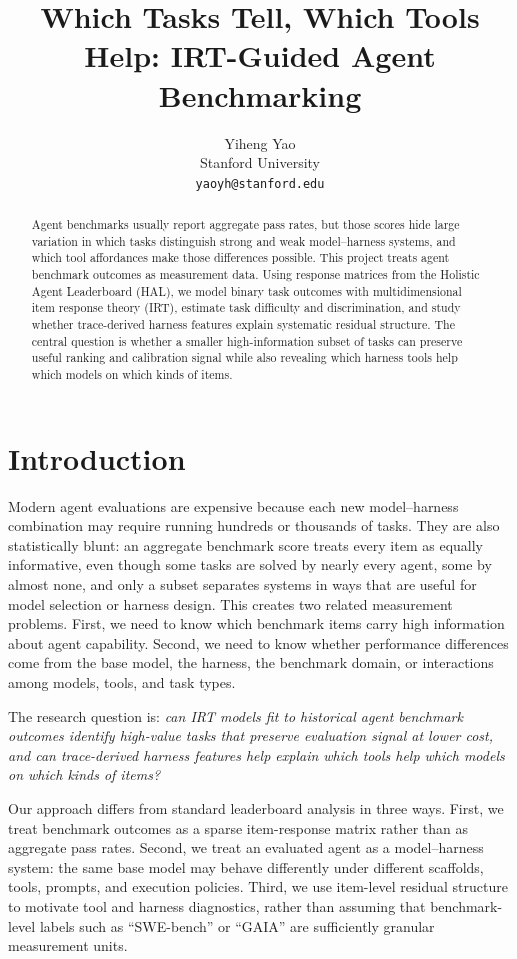 \documentclass{article}
\title{Which Tasks Tell, Which Tools Help: IRT-Guided Agent Benchmarking}
\author{%
  Yiheng Yao\\
  Stanford University\\
  \texttt{yaoyh@stanford.edu}\\
}
\begin{document}
\maketitle

\begin{abstract}
Agent benchmarks usually report aggregate pass rates, but those scores hide large variation in which tasks distinguish strong and weak model--harness systems, and which tool affordances make those differences possible. This project treats agent benchmark outcomes as measurement data. Using response matrices from the Holistic Agent Leaderboard (HAL), we model binary task outcomes with multidimensional item response theory (IRT), estimate task difficulty and discrimination, and study whether trace-derived harness features explain systematic residual structure. The central question is whether a smaller high-information subset of tasks can preserve useful ranking and calibration signal while also revealing which harness tools help which models on which kinds of items.
\end{abstract}

\section{Introduction}

Modern agent evaluations are expensive because each new model--harness combination may require running hundreds or thousands of tasks. They are also statistically blunt: an aggregate benchmark score treats every item as equally informative, even though some tasks are solved by nearly every agent, some by almost none, and only a subset separates systems in ways that are useful for model selection or harness design. This creates two related measurement problems. First, we need to know which benchmark items carry high information about agent capability. Second, we need to know whether performance differences come from the base model, the harness, the benchmark domain, or interactions among models, tools, and task types.

The research question is: \emph{can IRT models fit to historical agent benchmark outcomes identify high-value tasks that preserve evaluation signal at lower cost, and can trace-derived harness features help explain which tools help which models on which kinds of items?}

Our approach differs from standard leaderboard analysis in three ways. First, we treat benchmark outcomes as a sparse item-response matrix rather than as aggregate pass rates. Second, we treat an evaluated agent as a model--harness system: the same base model may behave differently under different scaffolds, tools, prompts, and execution policies. Third, we use item-level residual structure to motivate tool and harness diagnostics, rather than assuming that benchmark-level labels such as ``SWE-bench'' or ``GAIA'' are sufficiently granular measurement units.
\end{document}
